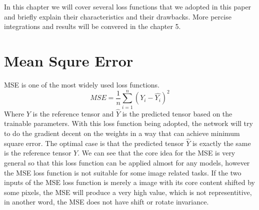\documentclass[a4paper,12pt,twoside]{report}
\begin{document}
In this chapter we will cover several loss functions that we adopted in this paper and briefly explain their characteristics and their drawbacks. More percise integrations and results will be convered in the chapter 5.

\section{Mean Squre Error}

MSE is one of the most widely used loss functions.
\begin{equation}
{MSE}=\frac{1}{n}\sum_{i=1}^n(Y_i-\hat{Y_i})^2
\end{equation}
Where ${Y}$ is the reference tensor and $\hat{Y}$ is the predicted tensor based on the trainable parameters. With this loss function being adopted, the network will try to do the gradient decent on the weights in a way that can achieve minimum square error. The optimal case is that the predicted tensor $\hat{Y}$ is exactly the same is the reference tensor ${Y}$. We can see that the core idea for the MSE is very general so that this loss function can be applied almost for any models, however the MSE loss function is not suitable for some image related tasks. If the two inputs of the MSE loss function is merely a image with its core content shifted by some pixels, the MSE will produce a very high value, which is not representitive, in another word, the MSE does not have shift or rotate invariance. 
\end{document}
